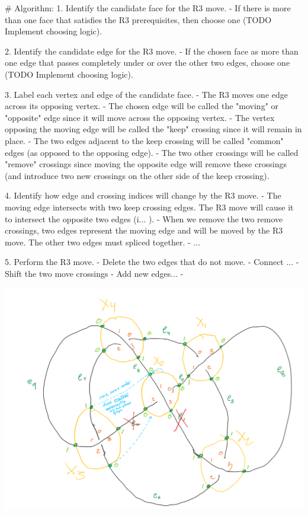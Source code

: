 # Algorithm:
1. Identify the candidate face for the R3 move.
    - If there is more than one face that satisfies the R3 prerequisites, then choose one (TODO Implement choosing logic).

2. Identify the candidate edge for the R3 move.
    - If the chosen face as more than one edge that passes completely under or over the other two edges, choose one (TODO Implement choosing logic).

3. Label each vertex and edge of the candidate face.
    - The R3 moves one edge across its opposing vertex.
    - The chosen edge will be called the "moving" or "opposite" edge since it will move across the opposing vertex.
    - The vertex opposing the moving edge will be called the "keep" crossing since it will remain in place.
    - The two edges adjacent to the keep crossing will be called "common" edges (as opposed to the opposing edge).
    - The two other crossings will be called "remove" crossings since moving the opposite edge will remove these crossings (and introduce two new crossings on the other side of the keep crossing).

4. Identify how edge and crossing indices will change by the R3 move.
    - The moving edge intersects with two keep crossing edges. The R3 move will cause it to intersect the opposite two edges (i... ).
    - When we remove the two remove crossings, two edges represent the moving edge and will be moved by the R3 move. The other two edges must spliced together.
    - ...

5. Perform the R3 move.
    - Delete the two edges that do not move.
    - Connect ...
    - Shift the two move crossings
    - Add new edges...
    -

\includegraphics[scale=0.5]{test_spatial_graph_diagrams/images/r3_before_move}

